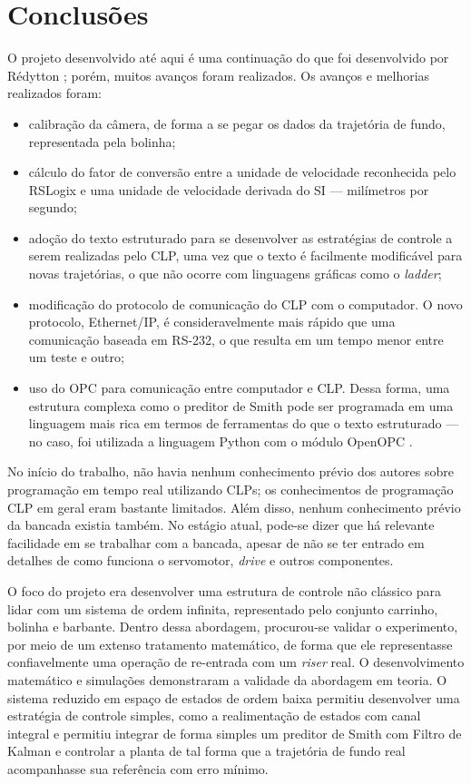 
\chapter{Conclusões}

\label{CapConclusoes}

O projeto desenvolvido até aqui é uma continuação do que foi desenvolvido por Rédytton \cite{redytton}; porém, muitos avanços foram realizados. Os avanços e melhorias realizados foram:
\begin{itemize}
\item calibração da câmera, de forma a se pegar os dados da trajetória de fundo, representada pela bolinha;
\item cálculo do fator de conversão entre a unidade de velocidade reconhecida pelo RSLogix e uma unidade de velocidade derivada do SI --- milímetros por segundo;
\item adoção do texto estruturado para se desenvolver as estratégias de controle a serem realizadas pelo CLP, uma vez que o texto é facilmente modificável para novas trajetórias, o que não ocorre com linguagens gráficas como o \textit{ladder};
\item modificação do protocolo de comunicação do CLP com o computador. O novo protocolo, Ethernet/IP, é consideravelmente mais rápido que uma comunicação baseada em RS-232, o que resulta em um tempo menor entre um teste e outro;
\item uso do OPC para comunicação entre computador e CLP. Dessa forma, uma estrutura complexa como o preditor de Smith pode ser programada em uma linguagem mais rica em termos de ferramentas do que o texto estruturado --- no caso, foi utilizada a linguagem Python com o módulo OpenOPC \cite{OpenOPC}.
\end{itemize}

No início do trabalho, não havia nenhum conhecimento prévio dos autores sobre programação em tempo real utilizando CLPs; os conhecimentos de programação CLP em geral eram bastante limitados. Além disso, nenhum conhecimento prévio da bancada existia também. No estágio atual, pode-se dizer que há relevante facilidade em se trabalhar com a bancada, apesar de não se ter entrado em detalhes de como funciona o servomotor, \textit{drive} e outros componentes.

O foco do projeto era desenvolver uma estrutura de controle não clássico para lidar com um sistema de ordem infinita, representado pelo conjunto carrinho, bolinha e barbante. Dentro dessa abordagem, procurou-se validar o experimento, por meio de um extenso tratamento matemático, de forma que ele representasse confiavelmente uma operação de re-entrada com um \textit{riser} real. O desenvolvimento matemático e simulações demonstraram a validade da abordagem em teoria. O sistema reduzido em espaço de estados de ordem baixa permitiu desenvolver uma estratégia de controle simples, como a realimentação de estados com canal integral e permitiu integrar de forma simples um preditor de Smith com Filtro de Kalman e controlar a planta de tal forma que a trajetória de fundo real acompanhasse sua referência com erro mínimo.

